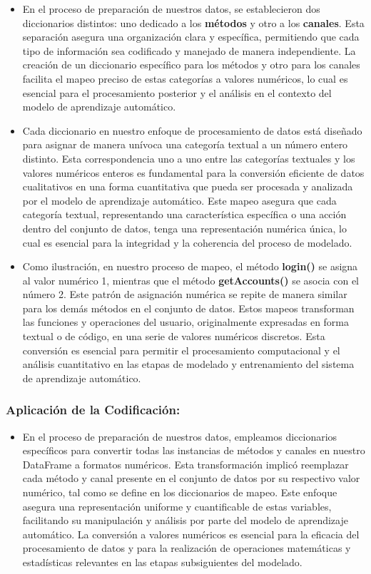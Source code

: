 \begin{itemize}
    \item En el proceso de preparación de nuestros datos, se establecieron dos diccionarios distintos: uno dedicado a los \textbf{métodos} y otro a los \textbf{canales}. Esta separación asegura una organización clara y específica, permitiendo que cada tipo de información sea codificado y manejado de manera independiente. La creación de un diccionario específico para los métodos y otro para los canales facilita el mapeo preciso de estas categorías a valores numéricos, lo cual es esencial para el procesamiento posterior y el análisis en el contexto del modelo de aprendizaje automático.
    \item Cada diccionario en nuestro enfoque de procesamiento de datos está diseñado para asignar de manera unívoca una categoría textual a un número entero distinto. Esta correspondencia uno a uno entre las categorías textuales y los valores numéricos enteros es fundamental para la conversión eficiente de datos cualitativos en una forma cuantitativa que pueda ser procesada y analizada por el modelo de aprendizaje automático. Este mapeo asegura que cada categoría textual, representando una característica específica o una acción dentro del conjunto de datos, tenga una representación numérica única, lo cual es esencial para la integridad y la coherencia del proceso de modelado.
    \item Como ilustración, en nuestro proceso de mapeo, el método \textbf{login()} se asigna al valor numérico 1, mientras que el método \textbf{getAccounts()} se asocia con el número 2. Este patrón de asignación numérica se repite de manera similar para los demás métodos en el conjunto de datos. Estos mapeos transforman las funciones y operaciones del usuario, originalmente expresadas en forma textual o de código, en una serie de valores numéricos discretos. Esta conversión es esencial para permitir el procesamiento computacional y el análisis cuantitativo en las etapas de modelado y entrenamiento del sistema de aprendizaje automático.
\end{itemize}

\subsubsection{Aplicación de la Codificación:}

\begin{itemize}
    \item En el proceso de preparación de nuestros datos, empleamos diccionarios específicos para convertir todas las instancias de métodos y canales en nuestro DataFrame a formatos numéricos. Esta transformación implicó reemplazar cada método y canal presente en el conjunto de datos por su respectivo valor numérico, tal como se define en los diccionarios de mapeo. Este enfoque asegura una representación uniforme y cuantificable de estas variables, facilitando su manipulación y análisis por parte del modelo de aprendizaje automático. La conversión a valores numéricos es esencial para la eficacia del procesamiento de datos y para la realización de operaciones matemáticas y estadísticas relevantes en las etapas subsiguientes del modelado.
\end{itemize}


